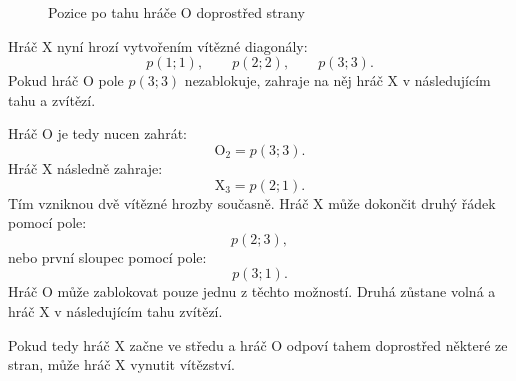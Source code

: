 \documentclass[12pt,a4paper]{article}
\begin{document}
\begin{figure}[h]
    \begin{center}
    \end{center}

    \caption{Pozice po tahu hráče $\mathrm{O}$ doprostřed strany}
    \label{fig:TicTacToeStrategieXStredStrana}
\end{figure}

Hráč $\mathrm{X}$ nyní hrozí vytvořením vítězné diagonály:
\[
    p(1;1),\qquad p(2;2),\qquad p(3;3).
\]
Pokud hráč $\mathrm{O}$ pole $p(3;3)$ nezablokuje, 
zahraje na něj hráč $\mathrm{X}$ v následujícím tahu a zvítězí.

Hráč $\mathrm{O}$ je tedy nucen zahrát:
\[
    \mathrm{O}_2=p(3;3).
\]
Hráč $\mathrm{X}$ následně zahraje:
\[
    \mathrm{X}_3=p(2;1).
\]
Tím vzniknou dvě vítězné hrozby současně.
Hráč $\mathrm{X}$ může dokončit druhý řádek pomocí pole:
\[
    p(2;3),
\]
nebo první sloupec pomocí pole:
\[
    p(3;1).
\]
Hráč $\mathrm{O}$ může zablokovat pouze jednu z těchto možností.
Druhá zůstane volná a hráč $\mathrm{X}$ v následujícím tahu zvítězí.

Pokud tedy hráč $\mathrm{X}$ začne ve středu
a hráč $\mathrm{O}$ odpoví tahem doprostřed některé ze stran,
 může hráč $\mathrm{X}$ vynutit vítězství.
\end{document}
